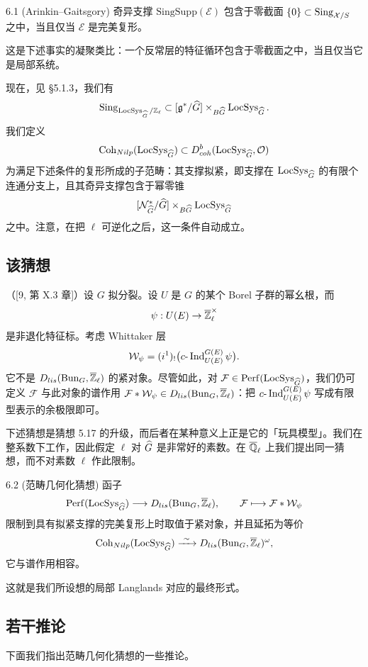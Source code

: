 \begin{thm}{6.1 (Arinkin--Gaitsgory)}\label{thm:a3-6-1}
奇异支撑 $\mathrm{SingSupp}(\mathcal{E})$ 包含于零截面 $\{0\}\subset\operatorname{Sing}_{\mathcal{X}/S}$ 之中，当且仅当 $\mathcal{E}$ 是完美复形。
\end{thm}

这是下述事实的凝聚类比：一个反常层的特征循环包含于零截面之中，当且仅当它是局部系统。

现在，见 §5.1.3，我们有
\[
\operatorname{Sing}_{\operatorname{LocSys}_{\widehat{G}}/\mathbb{Z}_\ell}\subset[\mathfrak{g}^*/\widehat{G}]\times_{B\widehat{G}}\operatorname{LocSys}_{\widehat{G}}.
\]
我们定义
\[
\operatorname{Coh}_{Nilp}(\operatorname{LocSys}_{\widehat{G}})\subset D^b_{coh}(\operatorname{LocSys}_{\widehat{G}},\mathcal{O})
\]
为满足下述条件的复形所成的子范畴：其支撑拟紧，即支撑在 $\operatorname{LocSys}_{\widehat{G}}$ 的有限个连通分支上，且其奇异支撑包含于幂零锥
\[
[\mathcal{N}^*_{\widehat{G}}/\widehat{G}]\times_{B\widehat{G}}\operatorname{LocSys}_{\widehat{G}}
\]
之中。注意，在把 $\ell$ 可逆化之后，这一条件自动成立。

\subsection{该猜想}
（[9, 第 X.3 章]）设 $G$ 拟分裂。设 $U$ 是 $G$ 的某个 Borel 子群的幂幺根，而
\[
\psi:U(E)\to\overline{\mathbb{Z}}_\ell^\times
\]
是非退化特征标。考虑 Whittaker 层
\[
\mathcal{W}_\psi=(i^1)_!\bigl(c\text{-}\operatorname{Ind}_{U(E)}^{G(E)}\psi\bigr).
\]
它不是 $D_{lis}(\operatorname{Bun}_G,\overline{\mathbb{Z}}_\ell)$ 的紧对象。尽管如此，对 $\mathcal{F}\in\operatorname{Perf}(\operatorname{LocSys}_{\widehat{G}})$，我们仍可定义 $\mathcal{F}$ 与此对象的谱作用 $\mathcal{F}*\mathcal{W}_\psi\in D_{lis}(\operatorname{Bun}_G,\overline{\mathbb{Z}}_\ell)$：把 $c\text{-}\operatorname{Ind}_{U(E)}^{G(E)}\psi$ 写成有限型表示的余极限即可。

下述猜想是猜想 5.17 的升级，而后者在某种意义上正是它的「玩具模型」。我们在整系数下工作，因此假定 $\ell$ 对 $\widehat{G}$ 是非常好的素数。在 $\overline{\mathbb{Q}}_\ell$ 上我们提出同一猜想，而不对素数 $\ell$ 作此限制。

\begin{conj}{6.2 (范畴几何化猜想)}\label{conj:a3-6-2}
函子
\[
\operatorname{Perf}(\operatorname{LocSys}_{\widehat{G}})\longrightarrow D_{lis}(\operatorname{Bun}_G,\overline{\mathbb{Z}}_\ell),\qquad \mathcal{F}\longmapsto\mathcal{F}*\mathcal{W}_\psi
\]
限制到具有拟紧支撑的完美复形上时取值于紧对象，并且延拓为等价
\[
\Coh_{Nilp}(\LocSys_{\hatG})\xrightarrow{\ \sim\ }D_{lis}(\Bun_G,\overline{\Z}_\ell)^\omega,
\]
它与谱作用相容。
\end{conj}

这就是我们所设想的局部 Langlands 对应的最终形式。

\subsection{若干推论}
下面我们指出范畴几何化猜想的一些推论。

